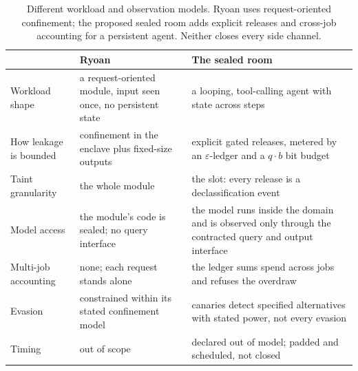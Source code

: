 \documentclass[11pt,a4paper]{article}
\theoremstyle{definition}
\begin{document}
\begin{table}[H]\centering\footnotesize
\caption{Different workload and observation models. Ryoan uses request-oriented
confinement; the proposed sealed room adds explicit releases and cross-job
accounting for a persistent agent. Neither closes every side channel.}
\label{tab:sealed-ryoan}
\begin{tabularx}{\textwidth}{@{}>{\raggedright\arraybackslash}p{2.2cm} >{\raggedright\arraybackslash}X >{\raggedright\arraybackslash}X@{}}
\toprule
 & Ryoan & The sealed room \\
\midrule
Workload shape & a request-oriented module, input seen once, no persistent state & a looping, tool-calling agent with state across steps \\
How leakage is bounded & confinement in the enclave plus fixed-size outputs & explicit gated releases, metered by an $\varepsilon$-ledger and a $q\cdot b$ bit budget \\
Taint granularity & the whole module & the slot: every release is a declassification event \\
Model access & the module's code is sealed; no query interface & the model runs inside the domain and is observed only through the contracted query and output interface \\
Multi-job accounting & none; each request stands alone & the ledger sums spend across jobs and refuses the overdraw \\
Evasion & constrained within its stated confinement model & canaries detect specified alternatives with stated power, not every evasion \\
Timing & out of scope & declared out of model; padded and scheduled, not closed \\
\bottomrule
\end{tabularx}
\end{table}
\FloatBarrier
\end{document}
